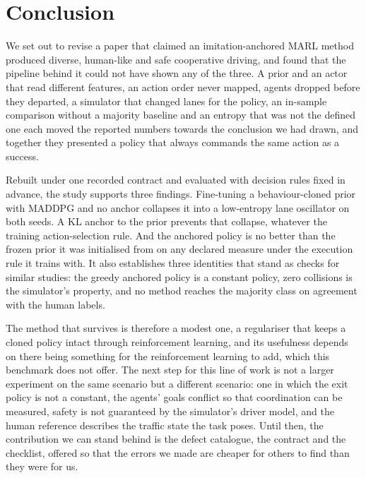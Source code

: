 \section{Conclusion}
\label{sec:conclusion}

We set out to revise a paper that claimed an imitation-anchored MARL method produced diverse, human-like and safe cooperative driving, and found that the pipeline behind it could not have shown any of the three. A prior and an actor that read different features, an action order never mapped, agents dropped before they departed, a simulator that changed lanes for the policy, an in-sample comparison without a majority baseline and an entropy that was not the defined one each moved the reported numbers towards the conclusion we had drawn, and together they presented a policy that always commands the same action as a success.

Rebuilt under one recorded contract and evaluated with decision rules fixed in advance, the study supports three findings. Fine-tuning a behaviour-cloned prior with MADDPG and no anchor collapses it into a low-entropy lane oscillator on both seeds. A KL anchor to the prior prevents that collapse, whatever the training action-selection rule. And the anchored policy is no better than the frozen prior it was initialised from on any declared measure under the execution rule it trains with. It also establishes three identities that stand as checks for similar studies: the greedy anchored policy is a constant policy, zero collisions is the simulator's property, and no method reaches the majority class on agreement with the human labels.

The method that survives is therefore a modest one, a regulariser that keeps a cloned policy intact through reinforcement learning, and its usefulness depends on there being something for the reinforcement learning to add, which this benchmark does not offer. The next step for this line of work is not a larger experiment on the same scenario but a different scenario: one in which the exit policy is not a constant, the agents' goals conflict so that coordination can be measured, safety is not guaranteed by the simulator's driver model, and the human reference describes the traffic state the task poses. Until then, the contribution we can stand behind is the defect catalogue, the contract and the checklist, offered so that the errors we made are cheaper for others to find than they were for us.
